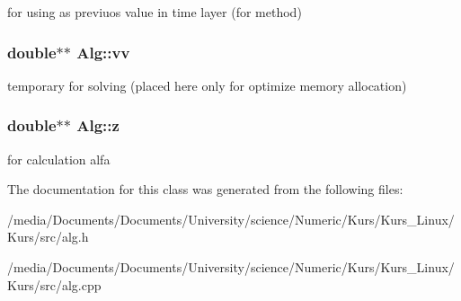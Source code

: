 \label{classAlg_a1556924bbf451225dca91c36a7b65071}
for using as previuos value in time layer (for method) \hypertarget{classAlg_a39918c7b3ec73091844aaa16482b60bc}{
\subsubsection[{vv}]{\setlength{\rightskip}{0pt plus 5cm}double$\ast$$\ast$ {\bf Alg::vv}}}
\label{classAlg_a39918c7b3ec73091844aaa16482b60bc}
temporary for solving (placed here only for optimize memory allocation) \hypertarget{classAlg_abe075d41b8b6c5d13788d18cbc0abb13}{
\subsubsection[{z}]{\setlength{\rightskip}{0pt plus 5cm}double$\ast$$\ast$ {\bf Alg::z}}}
\label{classAlg_abe075d41b8b6c5d13788d18cbc0abb13}
for calculation alfa 

The documentation for this class was generated from the following files:\begin{DoxyCompactItemize}
\item 
/media/Documents/Documents/University/science/Numeric/Kurs/Kurs\_\-Linux/Kurs/src/alg.h\item 
/media/Documents/Documents/University/science/Numeric/Kurs/Kurs\_\-Linux/Kurs/src/alg.cpp\end{DoxyCompactItemize}
